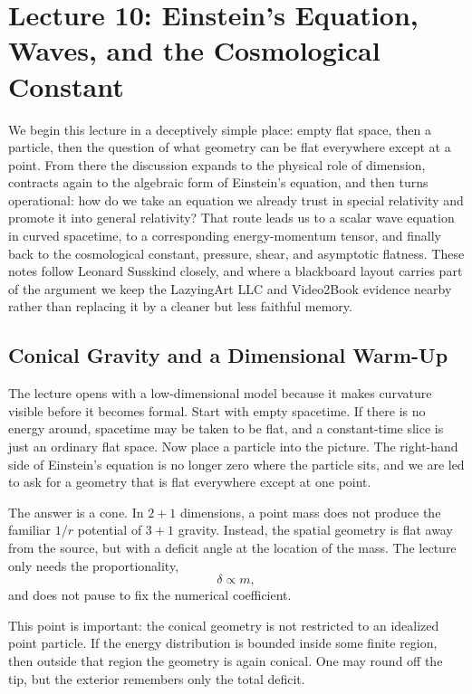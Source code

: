 \chapter{Lecture 10: Einstein's Equation, Waves, and the Cosmological Constant}

We begin this lecture in a deceptively simple place: empty flat space, then a particle, then the question of what geometry can be flat everywhere except at a point. From there the discussion expands to the physical role of dimension, contracts again to the algebraic form of Einstein's equation, and then turns operational: how do we take an equation we already trust in special relativity and promote it into general relativity? That route leads us to a scalar wave equation in curved spacetime, to a corresponding energy-momentum tensor, and finally back to the cosmological constant, pressure, shear, and asymptotic flatness. These notes follow Leonard Susskind closely, and where a blackboard layout carries part of the argument we keep the LazyingArt LLC and Video2Book evidence nearby rather than replacing it by a cleaner but less faithful memory.

\section{Conical Gravity and a Dimensional Warm-Up}

The lecture opens with a low-dimensional model because it makes curvature visible before it becomes formal. Start with empty spacetime. If there is no energy around, spacetime may be taken to be flat, and a constant-time slice is just an ordinary flat space. Now place a particle into the picture. The right-hand side of Einstein's equation is no longer zero where the particle sits, and we are led to ask for a geometry that is flat everywhere except at one point.

The answer is a cone. In \(2+1\) dimensions, a point mass does not produce the familiar \(1/r\) potential of \(3+1\) gravity. Instead, the spatial geometry is flat away from the source, but with a deficit angle at the location of the mass. The lecture only needs the proportionality,
\begin{equation}
\delta \propto m,
\end{equation}
and does not pause to fix the numerical coefficient.

This point is important: the conical geometry is not restricted to an idealized point particle. If the energy distribution is bounded inside some finite region, then outside that region the geometry is again conical. One may round off the tip, but the exterior remembers only the total deficit.

